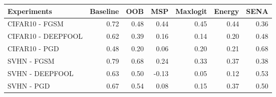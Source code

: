 \begin{tabular}{lrrrrrr}
\toprule
       Experiments &  Baseline &  OOB &   MSP &  Maxlogit &  Energy &  SENA \\
\midrule
    CIFAR10 - FGSM &      0.72 & 0.48 &  0.44 &      0.45 &    0.44 &  0.36 \\
CIFAR10 - DEEPFOOL &      0.62 & 0.39 &  0.16 &      0.14 &    0.20 &  0.48 \\
     CIFAR10 - PGD &      0.48 & 0.20 &  0.06 &      0.20 &    0.21 &  0.68 \\
       SVHN - FGSM &      0.79 & 0.68 &  0.24 &      0.33 &    0.37 &  0.38 \\
   SVHN - DEEPFOOL &      0.63 & 0.50 & -0.13 &      0.05 &    0.12 &  0.53 \\
        SVHN - PGD &      0.67 & 0.54 &  0.08 &      0.15 &    0.37 &  0.50 \\
\bottomrule
\end{tabular}
